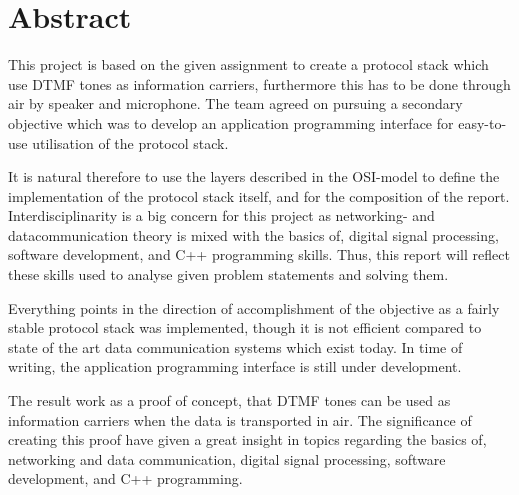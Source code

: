 \chapter*{Abstract}
This project is based on the given assignment to create a protocol stack which
use DTMF tones as information carriers, furthermore this has to be done through air
by speaker and microphone. The team agreed on pursuing a secondary objective which
was to develop an application programming interface for easy-to-use utilisation of
the protocol stack.

It is natural therefore to use the layers described in the OSI-model to define
the implementation of the protocol stack itself, and for the composition of the report.
Interdisciplinarity is a big concern for this project as networking- and datacommunication
theory is mixed with the basics of, digital signal processing, software development,
and C++ programming skills. Thus, this report will reflect these skills used to analyse given
problem statements and solving them.

Everything points in the direction of accomplishment of the objective as a fairly stable 
protocol stack was implemented, though it is not efficient compared to state of the art
data communication systems which exist today. In time of writing, the application programming
interface is still under development.

The result work as a proof of concept, that DTMF tones can be used as information carriers
when the data is transported in air. The significance of creating this proof have given a
great insight in topics regarding the basics of, networking and data communication,
digital signal processing, software development, and C++ programming.